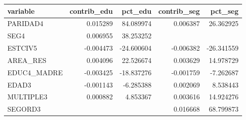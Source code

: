 \begin{tabular}{lrrrr}
\toprule
variable & contrib\_edu & pct\_edu & contrib\_seg & pct\_seg \\
\midrule
PARIDAD4 & 0.015289 & 84.089974 & 0.006387 & 26.362925 \\
SEG4 & 0.006955 & 38.253252 &  &  \\
ESTCIV5 & -0.004473 & -24.600604 & -0.006382 & -26.341559 \\
AREA\_RES & 0.004096 & 22.526674 & 0.003629 & 14.978729 \\
EDUC4\_MADRE & -0.003425 & -18.837276 & -0.001759 & -7.262687 \\
EDAD3 & -0.001143 & -6.285388 & 0.002069 & 8.538443 \\
MULTIPLE3 & 0.000882 & 4.853367 & 0.003616 & 14.924276 \\
SEGORD3 &  &  & 0.016668 & 68.799873 \\
\bottomrule
\end{tabular}
